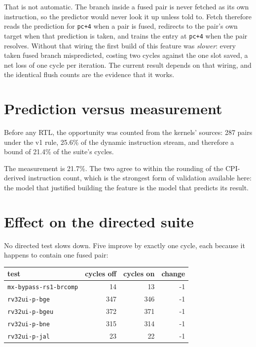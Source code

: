 \documentclass[11pt]{article}
\begin{document}
That is not automatic. The branch inside a fused pair is never fetched as its own
instruction, so the predictor would never look it up unless told to. Fetch therefore reads
the prediction for \texttt{pc+4} when a pair is fused, redirects to the pair's own target
when that prediction is taken, and trains the entry at \texttt{pc+4} when the pair resolves.
Without that wiring the first build of this feature was \emph{slower}: every taken fused
branch mispredicted, costing two cycles against the one slot saved, a net loss of one cycle
per iteration. The current result depends on that wiring, and the identical flush counts are
the evidence that it works.

\section{Prediction versus measurement}

Before any RTL, the opportunity was counted from the kernels' sources: 287 pairs under the
v1 rule, 25.6\% of the dynamic instruction stream, and therefore a bound of 21.4\% of the
suite's cycles.

The measurement is 21.7\%. The two agree to within the rounding of the CPI-derived
instruction count, which is the strongest form of validation available here: the model that
justified building the feature is the model that predicts its result.

\section{Effect on the directed suite}

No directed test slows down. Five improve by exactly one cycle, each because it happens to
contain one fused pair:

\begin{table}[h]
\centering
\begin{tabular}{lrrr}
\toprule
test & cycles off & cycles on & change \\
\midrule
\texttt{mx-bypass-rs1-brcomp} & 14 & 13 & -1 \\
\texttt{rv32ui-p-bge} & 347 & 346 & -1 \\
\texttt{rv32ui-p-bgeu} & 372 & 371 & -1 \\
\texttt{rv32ui-p-bne} & 315 & 314 & -1 \\
\texttt{rv32ui-p-jal} & 23 & 22 & -1 \\
\bottomrule
\end{tabular}
\end{table}
\end{document}
